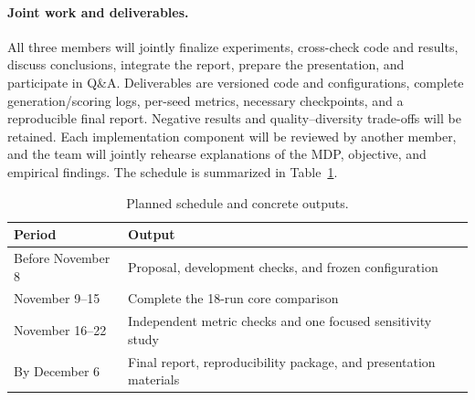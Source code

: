 \documentclass{article}
\begin{document}
\paragraph{Joint work and deliverables.}
All three members will jointly finalize experiments, cross-check code and
results, discuss conclusions, integrate the report, prepare the presentation,
and participate in Q\&A. Deliverables are versioned code and configurations,
complete generation/scoring logs, per-seed metrics, necessary checkpoints,
and a reproducible final report. Negative results and quality--diversity
trade-offs will be retained. Each implementation component will be reviewed by
another member, and the team will jointly rehearse explanations of the MDP,
objective, and empirical findings. The schedule is summarized in
Table~\ref{tab:schedule}.

\begin{table}[H]
\caption{Planned schedule and concrete outputs.}
\label{tab:schedule}
\centering
\begin{tabularx}{\linewidth}{@{}l X@{}}
\toprule
Period & Output \\
\midrule
Before November 8 & Proposal, development checks, and frozen configuration \\
November 9--15 & Complete the 18-run core comparison \\
November 16--22 & Independent metric checks and one focused sensitivity study \\
By December 6 & Final report, reproducibility package, and presentation materials \\
\bottomrule
\end{tabularx}
\end{table}

\clearpage


\end{document}
